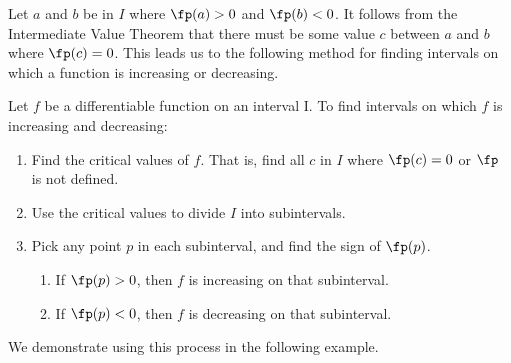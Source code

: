 
Let $a$ and $b$ be in $I$ where $\fp(a)>0$ and $\fp(b)<0$. It follows from the Intermediate Value Theorem that there must be some value $c$ between $a$ and $b$ where $\fp(c) = 0$. This leads us to the following method for finding intervals on which a function is increasing or decreasing.

{Let $f$ be a differentiable function on an interval I. To find intervals on which $f$ is increasing and decreasing:
\begin{enumerate}
\item	Find the critical values of $f$. That is, find all $c$ in $I$ where $\fp(c) = 0$ or $\fp$ is not defined.
\item		Use the critical values to divide $I$ into subintervals.
\item		Pick any point $p$ in each subinterval, and find the sign of $\fp(p)$. 
		\begin{enumerate}
		\item		If $\fp(p)>0$, then $f$ is increasing on that subinterval.
		\item		If $\fp(p)<0$, then $f$ is decreasing on that subinterval.
		\end{enumerate}
\end{enumerate}
}

We demonstrate using this process in the following example.\\

